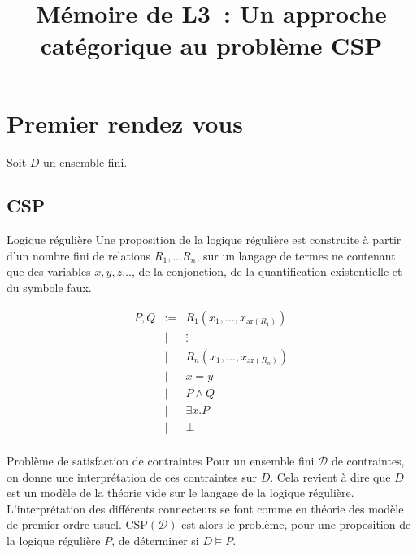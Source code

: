\documentclass[12pt]{article}
\title{Mémoire de L3~: Un approche catégorique au problème CSP}
\author{}
\newcommand\ar{\text{ar}}
\newcommand\csp{\text{CSP}}
\begin{document}
\maketitle


\section{Premier rendez vous}

Soit $D$ un ensemble fini.

\subsection{CSP}

\begin{defi}{Logique régulière}
    Une proposition de la logique régulière est construite à partir d'un nombre
    fini de relations $R_1, \dots R_n$, sur un langage de termes ne contenant que
    des variables $x, y, z \dots$, de la conjonction, de la quantification existentielle
    et du symbole faux.

    \[\begin{array}{rcl}
        P, Q & := & R_1(x_1, \dots, x_{\ar(R_1)}) \\
             & |  & \vdots                        \\
             & |  & R_n(x_1, \dots, x_{\ar(R_n)}) \\
             & |  & x = y                         \\
             & |  & P \wedge Q                    \\
             & |  & \exists x. P                  \\
             & |  & \bot                          \\
    \end{array}\]
\end{defi}

\begin{defi}{Problème de satisfaction de contraintes}
    Pour un ensemble fini $\mathcal{D}$ de contraintes, on donne une interprétation de
    ces contraintes sur $D$. Cela revient à dire que $D$ est un modèle de la théorie
    vide sur le langage de la logique régulière. L'interprétation des différents 
    connecteurs se font comme en théorie des modèle de premier ordre usuel. 
    $\csp(\mathcal{D})$ est alors le problème, pour une proposition de la logique
    régulière $P$, de déterminer si $D\models P$.
\end{defi}
\end{document}
